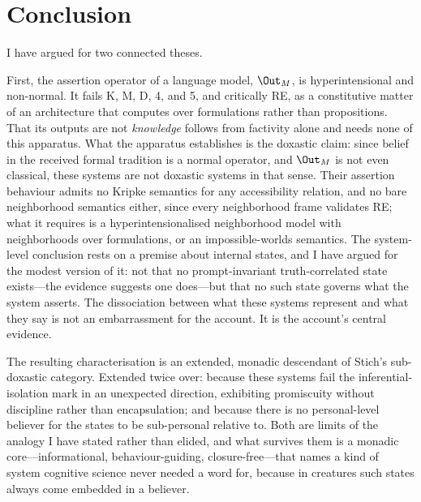 \section{Conclusion}
\label{sec:conclusion}

I have argued for two connected theses.

First, the assertion operator of a language model, $\Out_M$, is hyperintensional
and non-normal. It fails K, M, D, 4, and 5, and critically RE, as a constitutive
matter of an architecture that computes over formulations rather than
propositions. That its outputs are not \emph{knowledge} follows from factivity
alone and needs none of this apparatus. What the apparatus establishes is the
doxastic claim: since belief in the received formal tradition is a normal
operator, and $\Out_M$ is not even classical, these systems are not doxastic
systems in that sense. Their assertion behaviour admits no Kripke semantics for
any accessibility relation, and no bare neighborhood semantics either, since
every neighborhood frame validates RE; what it requires is a hyperintensionalised
neighborhood model with neighborhoods over formulations, or an impossible-worlds
semantics. The system-level conclusion rests on a premise about internal states,
and I have argued for the modest version of it: not that no prompt-invariant
truth-correlated state exists---the evidence suggests one does---but that no such
state governs what the system asserts. The dissociation between what these
systems represent and what they say is not an embarrassment for the account. It is
the account's central evidence.

The resulting characterisation is an extended, monadic descendant of Stich's
sub-doxastic category. Extended twice over: because these systems fail the
inferential-isolation mark in an unexpected direction, exhibiting promiscuity
without discipline rather than encapsulation; and because there is no
personal-level believer for the states to be sub-personal relative to. Both are
limits of the analogy I have stated rather than elided, and what survives them is
a monadic core---informational, behaviour-guiding, closure-free---that names a
kind of system cognitive science never needed a word for, because in creatures
such states always come embedded in a believer.

